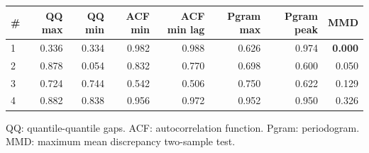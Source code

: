 \documentclass[11pt,a4paper]{article}
\begin{document}
\begin{center}
\begin{tabular}{lrrrrrrr}
\toprule
\# & QQ max & QQ min & ACF min & ACF min lag & Pgram max & Pgram peak & MMD \\
\midrule
1 & 0.336 & 0.334 & 0.982 & 0.988 & 0.626 & 0.974 & \textbf{0.000} \\
2 & 0.878 & 0.054 & 0.832 & 0.770 & 0.698 & 0.600 & 0.050 \\
3 & 0.724 & 0.744 & 0.542 & 0.506 & 0.750 & 0.622 & 0.129 \\
4 & 0.882 & 0.838 & 0.956 & 0.972 & 0.952 & 0.950 & 0.326 \\
\bottomrule
\end{tabular}
\end{center}

QQ: quantile-quantile gaps. ACF: autocorrelation function. Pgram: periodogram. MMD: maximum mean discrepancy two-sample test.
\end{document}
